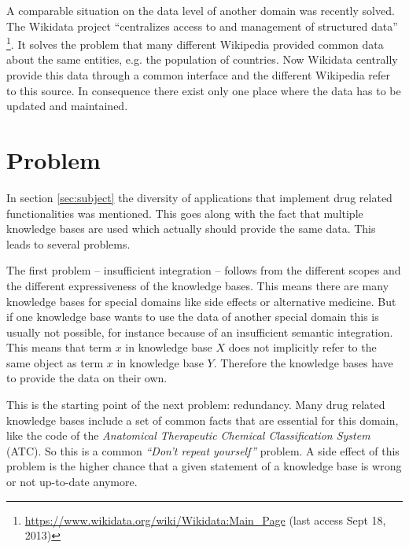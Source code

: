 A comparable situation on the data level of another domain was recently solved.
The Wikidata project ``centralizes access to and management of structured data'' \footnote{\url{https://www.wikidata.org/wiki/Wikidata:Main_Page} (last access Sept 18, 2013)}.
It solves the problem that many different Wikipedia provided common data about the same entities, e.g. the population of countries.
Now Wikidata centrally provide this data through a common interface and the different Wikipedia refer to this source.
In consequence there exist only one place where the data has to be updated and maintained.



\section{Problem}
\label{sec:problem}

In section \ref{sec:subject} the diversity of applications that implement drug related functionalities was mentioned.
This goes along with the fact that multiple knowledge bases are used which actually should provide the same data. 
This leads to several problems.

The first problem -- insufficient integration -- follows from the different scopes and the different expressiveness of the knowledge bases.
This means there are many knowledge bases for special domains like side effects or alternative medicine.
But if one knowledge base wants to use the data of another special domain this is usually not possible, for instance because of an insufficient semantic integration.
This means that term $x$ in knowledge base $X$ does not implicitly refer to the same object as term $x$ in knowledge base $Y$.
Therefore the knowledge bases have to provide the data on their own.

This is the starting point of the next problem: redundancy.
Many drug related knowledge bases include a set of common facts that are essential for this domain, like the code of the \textit{Anatomical Therapeutic Chemical Classification System} (ATC).
So this is a common \textit{``Don't repeat yourself''} problem.
A side effect of this problem is the higher chance that a given statement of a knowledge base is wrong or not up-to-date anymore.

